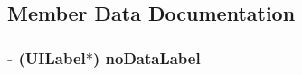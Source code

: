 \subsection{Member Data Documentation}
\hypertarget{interface_w_folder_view_controller_a48a9972a0bb5a46bbc214d87cb8f7df3}{
\subsubsection[{no\-Data\-Label}]{\setlength{\rightskip}{0pt plus 5cm}-\/ (U\-I\-Label$\ast$) no\-Data\-Label\hspace{0.3cm}{\ttfamily [protected]}}}\label{interface_w_folder_view_controller_a48a9972a0bb5a46bbc214d87cb8f7df3}


